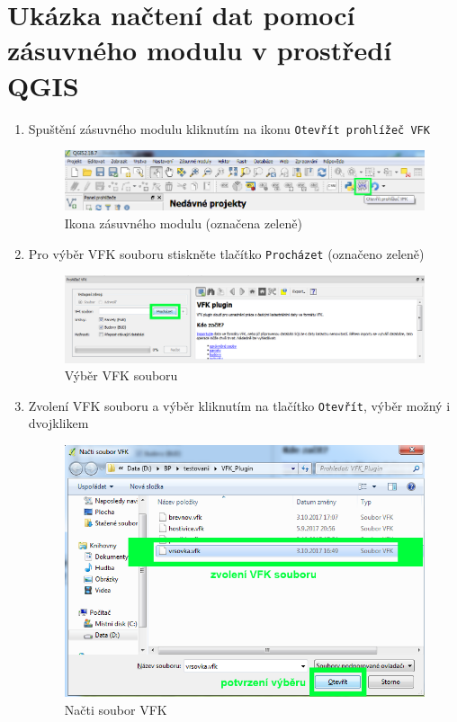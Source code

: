  \section{Ukázka načtení dat pomocí zásuvného modulu v prostředí QGIS}
 \label{sec:nacteni_dat_ukazka}
 \begin{enumerate}
 \item{Spuštění zásuvného modulu kliknutím na ikonu \texttt{Otevřít prohlížeč VFK}}
  \begin{figure}[H]
	 \centering
      \includegraphics[width=15cm]{./pictures/nacteni_1kr.png}
      \caption{Ikona zásuvného modulu (označena zeleně)}
      \label{fig:1kr_nacteni}
  \end{figure}
  
  \item{Pro výběr VFK souboru stiskněte tlačítko \texttt{Procházet} (označeno zeleně)}
  \begin{figure}[H]
	 \centering
      \includegraphics[width=15cm]{./pictures/nacteni_2kr.png}
      \caption{Výběr VFK souboru}
      \label{fig:2kr_nacteni}
  \end{figure}
  
  \item{Zvolení VFK souboru a výběr kliknutím na tlačítko \texttt{Otevřít}, výběr možný i dvojklikem}
  \begin{figure}[H]
	 \centering
      \includegraphics[width=15cm]{./pictures/nacteni_3kr.png}
      \caption{Načti soubor VFK}
      \label{fig:3kr_nacteni}
  \end{figure}
  

\end{enumerate}
